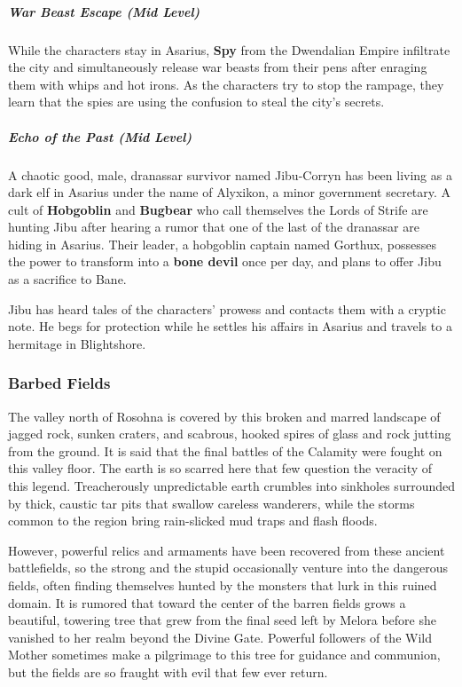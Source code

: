 \documentclass[10pt,a4paper,twoside,bg=print,twocolumn,openany,nodeprecatedcode]{dndbook}
\begin{document}
\subparagraph{War Beast Escape (Mid Level)}
While the characters stay in Asarius, \textbf{Spy} from the Dwendalian Empire infiltrate the city and simultaneously release war beasts from their pens after enraging them with whips and hot irons. As the characters try to stop the rampage, they learn that the spies are using the confusion to steal the city's secrets.

\subparagraph{Echo of the Past (Mid Level)}
A chaotic good, male, dranassar survivor named Jibu-Corryn has been living as a dark elf in Asarius under the name of Alyxikon, a minor government secretary. A cult of \textbf{Hobgoblin} and \textbf{Bugbear} who call themselves the Lords of Strife are hunting Jibu after hearing a rumor that one of the last of the dranassar are hiding in Asarius. Their leader, a hobgoblin captain named Gorthux, possesses the power to transform into a \textbf{bone devil} once per day, and plans to offer Jibu as a sacrifice to Bane.

Jibu has heard tales of the characters' prowess and contacts them with a cryptic note. He begs for protection while he settles his affairs in Asarius and travels to a hermitage in Blightshore.

\subsubsection{Barbed Fields}
The valley north of Rosohna is covered by this broken and marred landscape of jagged rock, sunken craters, and scabrous, hooked spires of glass and rock jutting from the ground. It is said that the final battles of the Calamity were fought on this valley floor. The earth is so scarred here that few question the veracity of this legend. Treacherously unpredictable earth crumbles into sinkholes surrounded by thick, caustic tar pits that swallow careless wanderers, while the storms common to the region bring rain-slicked mud traps and flash floods.

However, powerful relics and armaments have been recovered from these ancient battlefields, so the strong and the stupid occasionally venture into the dangerous fields, often finding themselves hunted by the monsters that lurk in this ruined domain. It is rumored that toward the center of the barren fields grows a beautiful, towering tree that grew from the final seed left by Melora before she vanished to her realm beyond the Divine Gate. Powerful followers of the Wild Mother sometimes make a pilgrimage to this tree for guidance and communion, but the fields are so fraught with evil that few ever return.
\end{document}

